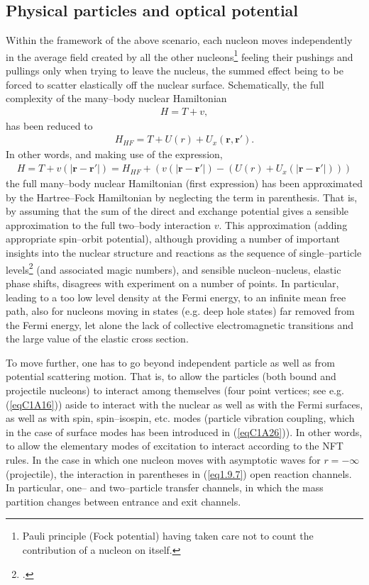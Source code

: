 \subsection{Physical particles and optical potential}\label{sect1.9.2}
Within the framework of the above scenario, each nucleon moves independently in the average field created by all the other nucleons\footnote{Pauli principle (Fock potential) having taken care not to count the contribution of a nucleon on itself.} feeling their pushings and pullings only when trying to leave the nucleus, the summed effect being to be forced to scatter elastically off the nuclear surface. Schematically, the full complexity of the many--body nuclear Hamiltonian
\begin{align}
H=T+v,
\end{align}
has been reduced to
\begin{align}
H_{HF}=T+U(r)+U_x(\mathbf r,\mathbf r').
\end{align}
In other words, and making use of the expression,
\begin{align}\label{eq1.9.7}
H=T+v(|\mathbf r- \mathbf r'|)=H_{HF}+\left(v(|\mathbf r- \mathbf r'|)-(U(r)+U_x(|\mathbf r- \mathbf r'|))\right)
\end{align}
the full many--body nuclear Hamiltonian (first expression) has been approximated by the Hartree--Fock Hamiltonian
by neglecting the term in parenthesis. That is, by assuming that the sum of the direct and exchange potential gives a sensible approximation to the full two--body interaction $v$. This approximation (adding appropriate spin--orbit potential), although providing a number of important insights into the nuclear structure and reactions as the sequence of single--particle levels\footnote{\cite{Mayer:55}.} (and associated magic numbers), and sensible nucleon--nucleus, elastic phase shifts, disagrees with experiment on a number of points. In particular, leading to a too low level density at the Fermi energy,  to an infinite mean free path, also for nucleons moving in states (e.g. deep hole states) far removed from the Fermi energy, let alone the lack of collective electromagnetic transitions and the large value of the elastic cross section.

To move further, one has to go beyond independent particle as well as from potential scattering motion. That is, to allow the particles (both bound and projectile nucleons) to interact among themselves (four point vertices; see e.g. (\ref{eqC1A16})) aside to interact with the nuclear as well as with the Fermi surfaces, as well as with spin, spin--isospin, etc. modes (particle vibration coupling, which in the case of surface modes has been introduced in (\ref{eqC1A26})). In other words, to allow the elementary modes of excitation to interact according to the NFT rules. In the case in which  one nucleon moves with asymptotic waves for  $r=-\infty$ (projectile), the  interaction in parentheses in (\ref{eq1.9.7}) open reaction channels. In particular, one-- and two--particle transfer channels, in which the mass partition changes between entrance and exit channels.


